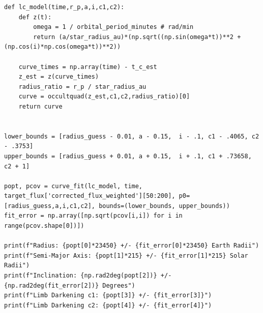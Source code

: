 \documentclass{article}
\begin{document}
\begin{appendices}
\begin{scriptsize}
\begin{verbatim}
def lc_model(time,r_p,a,i,c1,c2):
    def z(t):
        omega = 1 / orbital_period_minutes # rad/min
        return (a/star_radius_au)*(np.sqrt((np.sin(omega*t))**2 + (np.cos(i)*np.cos(omega*t))**2))

    curve_times = np.array(time) - t_c_est
    z_est = z(curve_times)
    radius_ratio = r_p / star_radius_au
    curve = occultquad(z_est,c1,c2,radius_ratio)[0]
    return curve
    

lower_bounds = [radius_guess - 0.01, a - 0.15,  i - .1, c1 - .4065, c2 - .3753]
upper_bounds = [radius_guess + 0.01, a + 0.15,  i + .1, c1 + .73658, c2 + 1]

popt, pcov = curve_fit(lc_model, time, target_flux['corrected_flux_weighted'][50:200], p0=[radius_guess,a,i,c1,c2], bounds=(lower_bounds, upper_bounds))
fit_error = np.array([np.sqrt(pcov[i,i]) for i in range(pcov.shape[0])])

print(f"Radius: {popt[0]*23450} +/- {fit_error[0]*23450} Earth Radii")
print(f"Semi-Major Axis: {popt[1]*215} +/- {fit_error[1]*215} Solar Radii")
print(f"Inclination: {np.rad2deg(popt[2])} +/- {np.rad2deg(fit_error[2])} Degrees")
print(f"Limb Darkening c1: {popt[3]} +/- {fit_error[3]}")
print(f"Limb Darkening c2: {popt[4]} +/- {fit_error[4]}")
\end{verbatim}
\end{scriptsize}


\end{appendices}
\end{document}

